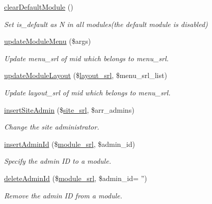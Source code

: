 \begin{DoxyCompactItemize}
\hyperlink{classmoduleController_a2534f4a4108716e06d61eb984f700fdb}{clear\+Default\+Module} ()
\begin{DoxyCompactList}\small\item\em Set is\+\_\+default as N in all modules(the default module is disabled) \end{DoxyCompactList}\item 
\hyperlink{classmoduleController_a7583bb9beb47ba3ecc1149546716e9f7}{update\+Module\+Menu} (\$args)
\begin{DoxyCompactList}\small\item\em Update menu\+\_\+srl of mid which belongs to menu\+\_\+srl. \end{DoxyCompactList}\item 
\hyperlink{classmoduleController_a4789510265aa0276d79e29cb9d9ce24c}{update\+Module\+Layout} (\$\hyperlink{ko_8install_8php_a70054876db09b2519a1726663c8dd9e7}{layout\+\_\+srl}, \$menu\+\_\+srl\+\_\+list)
\begin{DoxyCompactList}\small\item\em Update layout\+\_\+srl of mid which belongs to menu\+\_\+srl. \end{DoxyCompactList}\item 
\hyperlink{classmoduleController_a970ea23d2ebfdb1353139923a05a173a}{insert\+Site\+Admin} (\$\hyperlink{ko_8install_8php_a8b1406b4ad1048041558dce6bfe89004}{site\+\_\+srl}, \$arr\+\_\+admins)
\begin{DoxyCompactList}\small\item\em Change the site administrator. \end{DoxyCompactList}\item 
\hyperlink{classmoduleController_af50247418fd7c87424958e95ea466b00}{insert\+Admin\+Id} (\$\hyperlink{ko_8install_8php_a370bb6450fab1da3e0ed9f484a38b761}{module\+\_\+srl}, \$admin\+\_\+id)
\begin{DoxyCompactList}\small\item\em Specify the admin I\+D to a module. \end{DoxyCompactList}\item 
\hyperlink{classmoduleController_a3ba07d8a726a5f1d869480fa61a60487}{delete\+Admin\+Id} (\$\hyperlink{ko_8install_8php_a370bb6450fab1da3e0ed9f484a38b761}{module\+\_\+srl}, \$admin\+\_\+id= '')
\begin{DoxyCompactList}\small\item\em Remove the admin I\+D from a module. \end{DoxyCompactList}\item 

\end{DoxyCompactItemize}
